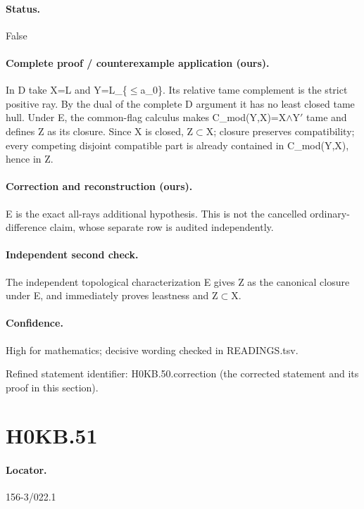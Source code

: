 \paragraph{Status.} False

\paragraph{Complete proof / counterexample application (ours).} In D take X=L and Y=L\_\{\ensuremath{\leq}a\_0\}. Its relative tame complement is the strict positive ray. By the dual of the complete D argument it has no least closed tame hull. Under E, the common-flag calculus makes C\_mod(Y,X)=X\ensuremath{\wedge}Y\ensuremath{\prime} tame and defines Z as its closure. Since X is closed, Z\ensuremath{\subset}X; closure preserves compatibility; every competing disjoint compatible part is already contained in C\_mod(Y,X), hence in Z.

\paragraph{Correction and reconstruction (ours).} E is the exact all-rays additional hypothesis. This is not the cancelled ordinary-difference claim, whose separate row is audited independently.

\paragraph{Independent second check.} The independent topological characterization E gives Z as the canonical closure under E, and immediately proves leastness and Z\ensuremath{\subset}X.

\paragraph{Confidence.} High for mathematics; decisive wording checked in READINGS.tsv.

\noindent Refined statement identifier: H0KB.50.correction (the corrected statement and its proof in this section).

\section*{H0KB.51}\label{statement:H0KB.51}
\paragraph{Locator.} 156-3/022.1

